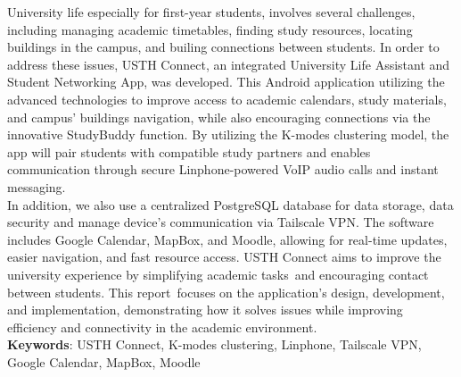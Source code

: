 \noindent University life
especially for first-year students, involves several 
challenges, including managing academic timetables, 
finding study resources, locating buildings in the campus, 
and builing connections between students. In order to address these 
issues, USTH Connect, an integrated University 
Life Assistant and Student Networking App, 
was developed. This Android application utilizing the advanced technologies to improve access to academic calendars, 
study materials, and campus' buildings navigation, 
while also encouraging connections 
via the innovative StudyBuddy function. 
By utilizing the K-modes clustering model, the app will pair students with compatible study partners and enables communication through secure 
Linphone-powered VoIP audio calls and instant messaging.\\

\noindent In addition, we also use a centralized PostgreSQL database for data storage, data security and manage device's communication via Tailscale VPN. The software 
includes Google Calendar, MapBox, and Moodle, 
allowing for real-time updates, 
easier navigation, and fast resource access. 
USTH Connect aims to improve the university 
experience by simplifying academic tasks and 
encouraging contact between students. This report focuses 
on the application's design, development, and implementation, 
demonstrating how it solves issues while improving 
efficiency and connectivity in the academic 
environment.\\

\noindent \textbf{Keywords}: USTH Connect,
K-modes clustering, Linphone, Tailscale VPN, Google Calendar, MapBox, Moodle

